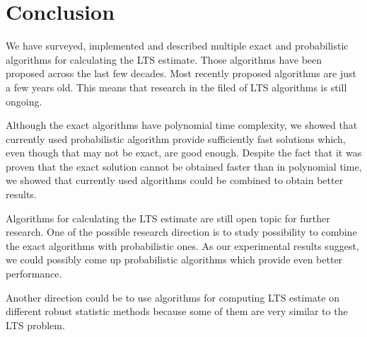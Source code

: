 
\chapter{Conclusion}
We have surveyed, implemented and described multiple exact and probabilistic algorithms for calculating the LTS estimate.
Those algorithms have been proposed across the last few decades. Most recently proposed algorithms are just a few years old. This means that research in the filed of LTS algorithms is still ongoing.

Although the exact algorithms have polynomial time complexity, we showed that currently used probabilistic algorithm provide sufficiently fast solutions which, even though that may not be exact, are good enough. Despite the fact that it was proven that the exact solution cannot be obtained faster than in polynomial time, we showed that currently used algorithms could be combined to obtain better results. 


Algorithms for calculating the LTS estimate are still open topic for further research. One of the possible research direction is to study possibility to combine the exact algorithms with probabilistic ones. As our experimental results suggest, we could possibly come up probabilistic algorithms which provide even better performance.

Another direction could be to use algorithms for computing LTS estimate on different robust statistic methods because some of them are very similar to the LTS problem.

